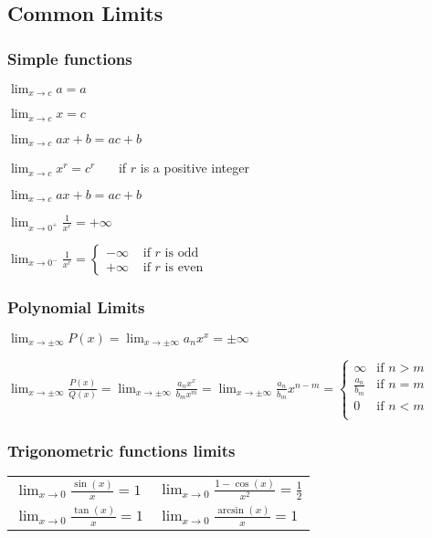 \subsection{Common Limits}
\subsubsection{Simple functions}
 $ \displaystyle \lim_{x \rightarrow c} a = a $

 $ \displaystyle \lim_{x \rightarrow c} x = c $

 $ \displaystyle \lim_{x \rightarrow c} ax + b = ac+b $

 $ \displaystyle \lim_{x \rightarrow c} x^r = c^r $ \ \ \ if $r$ is a positive integer

 $ \displaystyle \lim_{x \rightarrow c} ax + b = ac+b $ 

 $ \displaystyle \lim_{x \rightarrow 0^+} \frac{1}{x^r} = +\infty $
 
 $ \displaystyle \lim_{x \rightarrow 0^-} \frac{1}{x^r} = \begin{cases}
															 -\infty & \text{ if $r$ is odd } \\
															 +\infty & \text{ if $r$ is even }
															 \end{cases}
 $

\subsubsection{Polynomial Limits}
$ \displaystyle \lim_{x\rightarrow\pm\infty}P(x)=\lim_{x\rightarrow\pm\infty}a_nx^x=\pm\infty $

$ \displaystyle \lim_{x\rightarrow\pm\infty}\frac{P(x)}{Q(x)}=\lim_{x\rightarrow\pm\infty}\frac{a_nx^x}{b_mx^m}=\lim_{x\rightarrow\pm\infty}\frac{a_n}{b_m}x^{n-m}=
\begin{cases}
\infty & \text{if } n>m \\
\frac{a_n}{b_m} & \text{if } n=m \\
0 & \text{if } n<m \\
\end{cases} $

\subsubsection{Trigonometric functions limits}
\begin{tabular}{ l l }
$ \displaystyle \lim_{x\rightarrow0}\frac{\sin(x)}{x}=1 $ &
$ \displaystyle \lim_{x\rightarrow0}\frac{1-\cos(x)}{x^2}=\frac{1}{2} $ \\ [1.7ex]
$ \displaystyle \lim_{x\rightarrow0}\frac{\tan(x)}{x}=1 $ &
$ \displaystyle  \lim_{x\rightarrow0}\frac{\arcsin(x)}{x}=1 $ 
\end{tabular}

